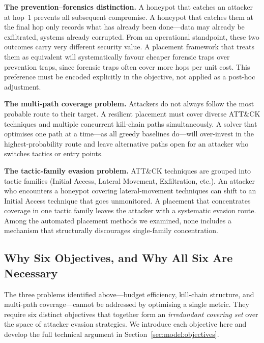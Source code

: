 \documentclass[journal]{IEEEtran}
\begin{document}
\textbf{The prevention--forensics distinction.}
A honeypot that catches an attacker at hop~1 prevents all subsequent
compromise. A honeypot that catches them at the final hop only
records what has already been done---data may already be exfiltrated,
systems already corrupted. From an operational standpoint, these two
outcomes carry very different security value. A placement framework
that treats them as equivalent will systematically favour cheaper
forensic traps over prevention traps, since forensic traps often
cover more hops per unit cost. This preference must be encoded
explicitly in the objective, not applied as a post-hoc adjustment.

\textbf{The multi-path coverage problem.}
Attackers do not always follow the most probable route to their
target. A resilient placement must cover diverse ATT\&CK techniques
and multiple concurrent kill-chain paths simultaneously. A solver
that optimises one path at a time---as all greedy baselines do---will
over-invest in the highest-probability route and leave alternative
paths open for an attacker who switches tactics or entry points.

\textbf{The tactic-family evasion problem.}
ATT\&CK techniques are grouped into tactic families (Initial Access,
Lateral Movement, Exfiltration, etc.). An attacker who encounters a
honeypot covering lateral-movement techniques can shift to an Initial
Access technique that goes unmonitored. A placement that concentrates
coverage in one tactic family leaves the attacker with a systematic
evasion route. Among the automated placement methods we examined,
none includes a mechanism that structurally discourages single-family
concentration.

\subsection{Why Six Objectives, and Why All Six Are Necessary}
\label{sec:intro:whysix}

The three problems identified above---budget efficiency, kill-chain
structure, and multi-path coverage---cannot be addressed by
optimising a single metric. They require six distinct objectives
that together form an \emph{irredundant covering set} over the space
of attacker evasion strategies. We introduce each objective here and
develop the full technical argument in Section~\ref{sec:model:objectives}.
\end{document}
